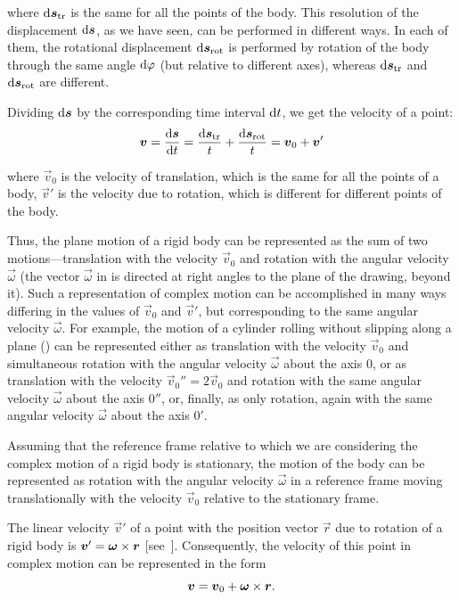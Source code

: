 \noindent
where $\mathrm{d}\boldsymbol{s}_{\text{tr}}$ is the same for all the points of the body. This resolution of the displacement $\mathrm{d}\boldsymbol{s}$, as we have seen, can be performed in different ways. In each of them, the rotational displacement $\mathrm{d}\boldsymbol{s}_{\text{rot}}$ is performed by rotation of the body through the same angle $\mathrm{d}\varphi$ (but relative to different axes), whereas $\mathrm{d}\boldsymbol{s}_{\text{tr}}$ and $\mathrm{d}\boldsymbol{s}_{\text{rot}}$ are different.

Dividing $\mathrm{d}\boldsymbol{s}$ by the corresponding time interval $\mathrm{d} t$, we get the velocity of a point:
\begin{equation*}
\boldsymbol{v} = \frac{\mathrm{d}\boldsymbol{s}}{\mathrm{d} t} = \frac{\mathrm{d}\boldsymbol{s}_{\text{tr}}}{t} + \frac{\mathrm{d}\boldsymbol{s}_{\text{rot}}}{t} = \boldsymbol{v}_0 + \boldsymbol{v}'
\end{equation*}

\noindent
where $\vec{v}_0$ is the velocity of translation, which is the same for all the points of a body, $\vec{v}'$ is the velocity due to rotation, which is different for different points of the body.

Thus, the plane motion of a rigid body can be represented as the sum of two motions---translation with the velocity $\vec{v}_0$ and rotation with the angular velocity $\vec{\omega}$ (the vector $\vec{\omega}$ in  is directed at right angles to the plane of the drawing, beyond it). Such a representation of complex motion can be accomplished in many ways differing in the values of $\vec{v}_0$ and $\vec{v}'$, but corresponding to the same angular velocity $\vec{\omega}$. For example, the motion of a cylinder rolling without slipping along a plane () can be represented either as translation with the velocity $\vec{v}_0$ and simultaneous rotation with the angular velocity $\vec{\omega}$ about the axis $0$, or as translation with the velocity $\vec{v}_0''=2\vec{v}_0$ and rotation with the same angular velocity $\vec{\omega}$ about the axis $0''$, or, finally, as only rotation, again with the same angular velocity $\vec{\omega}$ about the axis $0'$.

Assuming that the reference frame relative to which we are considering the complex motion of a rigid body is stationary, the motion of the body can be represented as rotation with the angular velocity $\vec{\omega}$ in a reference frame moving translationally with the velocity $\vec{v}_0$ relative to the stationary frame.

The linear velocity $\vec{v}'$ of a point with the position vector $\vec{r}$ due to rotation of a rigid body is $\boldsymbol{v}'=\boldsymbol{\omega}\times\boldsymbol{r}$ [see~]. Consequently, the velocity of this point in complex motion can be represented in the form
\begin{equation}\label{eq:5_1}
\boldsymbol{v} = \boldsymbol{v}_0 + \boldsymbol{\omega}\times\boldsymbol{r}.
\end{equation}

